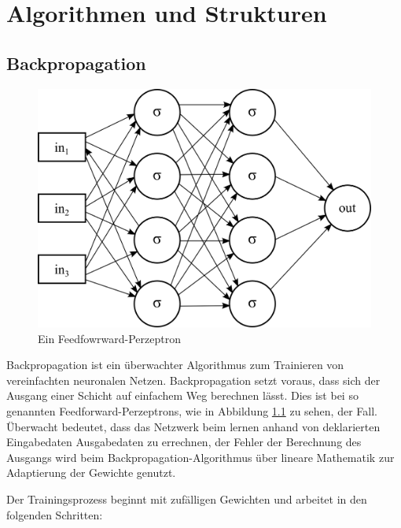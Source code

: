 \chapter{Algorithmen und Strukturen}
\label{cha:algorithmen}


\section{Backpropagation}

\begin{figure}
	\centering
	\includegraphics[scale=1]{images/net-for-bp.png}
	\caption{Ein Feedfowrward-Perzeptron}
	\label{fig:net-for-bp}
\end{figure}

Backpropagation ist ein überwachter Algorithmus zum Trainieren von vereinfachten neuronalen Netzen. Backpropagation setzt voraus, dass sich der Ausgang einer Schicht auf einfachem Weg berechnen lässt. Dies ist bei so genannten Feedforward-Perzeptrons, wie in Abbildung \ref{fig:net-for-bp} zu sehen, der Fall. Überwacht bedeutet, dass das Netzwerk beim lernen anhand von deklarierten Eingabedaten Ausgabedaten zu errechnen, der Fehler der Berechnung des Ausgangs wird beim Backpropagation-Algorithmus über lineare Mathematik zur Adaptierung der Gewichte genutzt.

Der Trainingsprozess beginnt mit zufälligen Gewichten und arbeitet in den folgenden Schritten:

